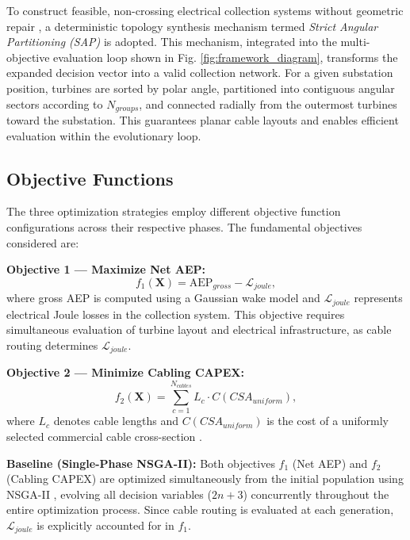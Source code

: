 \documentclass[format=sigconf,anonymous=true,review=true]{acmart}
\begin{document}
To construct feasible, non-crossing electrical collection systems without geometric repair \cite{Alencar2026Flexible, Ye2023Path}, a deterministic topology synthesis mechanism termed \textit{Strict Angular Partitioning (SAP)} is adopted.  This mechanism, integrated into the multi-objective evaluation loop shown in Fig. \ref{fig:framework_diagram}, transforms the expanded decision vector into a valid collection network. For a given substation position, turbines are sorted by polar angle, partitioned into contiguous angular sectors according to $N_{groups}$, and connected radially from the outermost turbines toward the substation.  
This guarantees planar cable layouts and enables efficient evaluation within the evolutionary loop.

\subsection{Objective Functions}

The three optimization strategies employ different objective function configurations across their respective phases. The fundamental objectives considered are:

\textbf{Objective 1 — Maximize Net AEP:}
\begin{equation}
f_1(\mathbf{X}) = \text{AEP}_{gross} - \mathcal{L}_{joule},
\end{equation}
where gross AEP is computed using a Gaussian wake model \cite{Bastankhah2014Gaussian, Bastankhah2016Gaussian} and $\mathcal{L}_{joule}$ represents electrical Joule losses in the collection system. This objective requires simultaneous evaluation of turbine layout and electrical infrastructure, as cable routing determines $\mathcal{L}_{joule}$.



\textbf{Objective 2 — Minimize Cabling CAPEX:}
\begin{equation}
f_2(\mathbf{X}) = \sum_{c=1}^{N_{cables}} L_c \cdot C(CSA_{uniform}),
\end{equation}
where $L_c$ denotes cable lengths and $C(CSA_{uniform})$ is the cost of a uniformly selected commercial cable cross-section \cite{Nakhai2023Electrical}.

\textbf{Baseline (Single-Phase NSGA-II):} Both objectives $f_1$ (Net AEP) and $f_2$ (Cabling CAPEX) are optimized simultaneously from the initial population using NSGA-II \cite{Deb2002NSGA2}, evolving all decision variables ($2n+3$) concurrently throughout the entire optimization process. Since cable routing is evaluated at each generation, $\mathcal{L}_{joule}$ is explicitly accounted for in $f_1$.
\end{document}
